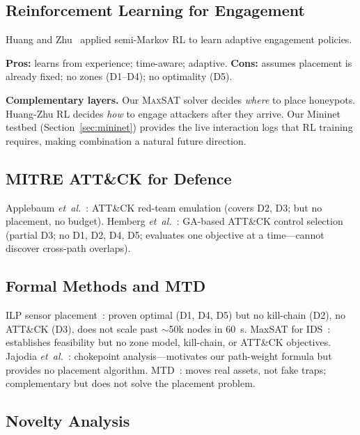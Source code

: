 \documentclass[journal]{IEEEtran}
\newcommand{\etal}{\emph{et~al.}}
\newcommand{\maxsat}{\textsc{MaxSAT}}
\begin{document}
\subsection{Reinforcement Learning for Engagement}

Huang and Zhu~\cite{huang2019} applied semi-Markov RL to
learn adaptive engagement policies.

\textbf{Pros:} learns from experience; time-aware; adaptive.
\textbf{Cons:} assumes placement is already fixed;
no zones (D1--D4); no optimality (D5).

\begin{insightbox}
\textbf{Complementary layers.}
Our \maxsat{} solver decides \emph{where} to place honeypots.
Huang-Zhu RL decides \emph{how} to engage attackers after
they arrive.
Our Mininet testbed (Section~\ref{sec:mininet}) provides
the live interaction logs that RL training requires,
making combination a natural future direction.
\end{insightbox}

\subsection{MITRE ATT\&CK for Defence}

Applebaum \etal{}~\cite{applebaum2016}: ATT\&CK red-team
emulation (covers D2, D3; but no placement, no budget).
Hemberg \etal{}~\cite{hemberg2020}: GA-based ATT\&CK control
selection (partial D3; no D1, D2, D4, D5; evaluates one
objective at a time---cannot discover cross-path overlaps).

\subsection{Formal Methods and MTD}

ILP sensor placement~\cite{saha2015}: proven optimal
(D1, D4, D5) but no kill-chain (D2), no ATT\&CK (D3),
does not scale past $\sim$50k nodes in 60~s.
MaxSAT for IDS~\cite{pinisetty2017}: establishes feasibility
but no zone model, kill-chain, or ATT\&CK objectives.
Jajodia \etal{}~\cite{jajodia2005}: chokepoint
analysis---motivates our path-weight formula but provides
no placement algorithm.
MTD~\cite{zhu2013}: moves real assets, not fake traps;
complementary but does not solve the placement problem.

\subsection{Novelty Analysis}
\label{subsec:novelty}
\end{document}
